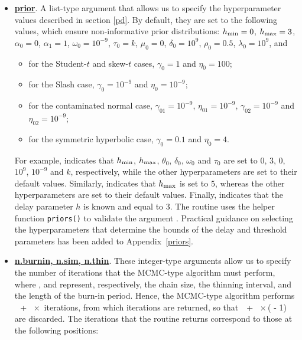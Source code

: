 \begin{itemize}
\item \underline{\bf prior}. A list-type argument that allows us to specify the hyperparameter values described in section \ref{pd}. By default, they are set to the following values, which ensure non-informative prior distributions: $h_{\rm min}=0$, $h_{\rm max}=3$, $\alpha_0=0$, $\alpha_1=1$, $\omega_0=10^{-9}$, $\tau_0=k$, $\mu_0=0$, $\delta_0=10^9$, $\rho_0=0.5$, $\lambda_0=10^9$, and
\begin{itemize}
\item for the Student-$t$ and skew-$t$ cases, $\gamma_{0}=1$ and $\eta_{0}=100$;
\item for the Slash case, $\gamma_{0}=10^{-9}$ and $\eta_{0}=10^{-9}$;
\item for the contaminated normal case, $\gamma_{01}=10^{-9}$, $\eta_{01}=10^{-9}$, $\gamma_{02}=10^{-9}$ and $\eta_{02}=10^{-9}$; 
\item for the symmetric hyperbolic case, $\gamma_{0}=0.1$ and $\eta_{0}=4$.
\end{itemize} 
For example,  indicates that $h_{\rm min}$, $h_{\rm max}$, $\theta_0$, $\delta_0$, $\omega_0$ and $\tau_0$ are set to $0$, $3$, $0$, $10^9$, $10^{-9}$ and $k$, respectively, while the other hyperparameters are set to their default values. Similarly,  indicates that $h_{\rm max}$ is set to $5$, whereas the other hyperparameters are set to their default values. Finally,  indicates that the delay parameter $h$ is known and equal to $3$. The routine  uses the helper function {\tt priors()} to validate the argument . Practical guidance on selecting the hyperparameters that determine the bounds of the delay and threshold parameters has been added to Appendix~\ref{priors}.

\item \underline{\bf n.burnin, n.sim, n.thin}. These integer-type arguments allow us to specify the number of iterations that the MCMC-type algorithm must perform, where ,  and  represent, respectively, the chain size, the thinning interval, and the length of the burn-in period. Hence, the MCMC-type algorithm performs \,\, + \,\,\,$\times$\, iterations, from which  iterations are returned, so that \,\, + \,\,\,$\times$\,(\,\,-\,\,1) are discarded. The  iterations that the routine  returns correspond to those at the following positions:


\end{itemize}
